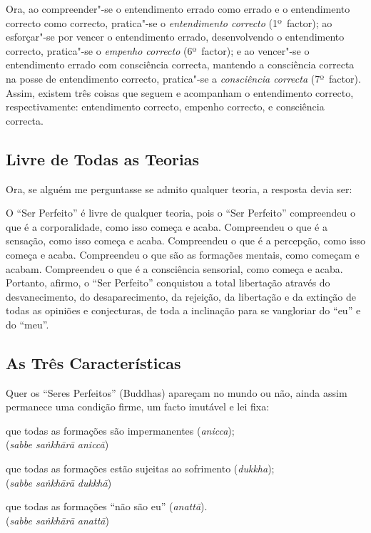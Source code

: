Ora, ao compreender"-se o entendimento errado como errado e o entendimento
correcto como correcto, pratica"-se o \emph{entendimento correcto} (1º~factor);
ao esforçar"-se por vencer o entendimento errado, desenvolvendo o entendimento
correcto, pratica"-se o \emph{empenho correcto} (6º~factor); e ao vencer"-se o
entendimento errado com consciência correcta, mantendo a consciência correcta na
posse de entendimento correcto, pratica"-se a \emph{consciência correcta}
(7º~factor). Assim, existem três coisas que seguem e acompanham o entendimento
correcto, respectivamente: entendimento correcto, empenho correcto, e
consciência correcta.


\subsection{Livre de Todas as Teorias}

Ora, se alguém me perguntasse se admito qualquer teoria, a resposta devia ser:

O “Ser Perfeito” é livre de qualquer teoria, pois o “Ser Perfeito”
compreendeu o que é a corporalidade, como isso começa e acaba. Compreendeu o que
é a sensação, como isso começa e acaba. Compreendeu o que é a percepção, como
isso começa e acaba. Compreendeu o que são as formações mentais, como começam e
acabam. Compreendeu o que é a consciência sensorial, como começa e acaba.
Portanto, afirmo, o “Ser Perfeito” conquistou a total libertação através do
desvanecimento, do desaparecimento, da rejeição, da libertação e da extinção de
todas as opiniões e conjecturas, de toda a inclinação para se vangloriar do
“eu” e do “meu”.


\subsection{As Três Características}

Quer os “Seres Perfeitos” (Buddhas) apareçam no mundo ou não, ainda
assim permanece uma condição firme, um facto imutável e lei fixa:

que todas as formações são impermanentes (\emph{anicca});\\
(\emph{sabbe saṅkhārā aniccā})

que todas as formações estão sujeitas ao sofrimento (\emph{dukkha});\\
(\emph{sabbe saṅkhārā dukkhā})

que todas as formações “não são eu” (\emph{anattā}).\\
(\emph{sabbe saṅkhārā anattā})

